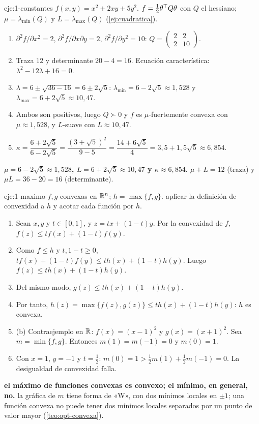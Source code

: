 \begin{solucion}{eje:1-constantes}
\datos $f(x,y)=x^{2}+2xy+5y^{2}$.
\planteamiento $f=\frac12\theta^{\top} Q\theta$ con $Q$ el hessiano; $\mu=\lambda_{\min}(Q)$ y $L=\lambda_{\max}(Q)$ (\cref{ej:cuadratica}).
\pasos
\begin{enumerate}[label=\arabic*.]
  \item $\partial^{2}f/\partial x^{2}=2$, $\partial^{2}f/\partial x\partial y=2$, $\partial^{2}f/\partial y^{2}=10$: $Q=\begin{pmatrix}2&2\\2&10\end{pmatrix}$.
  \item Traza $12$ y determinante $20-4=16$. Ecuación característica: $\lambda^{2}-12\lambda+16=0$.
  \item $\lambda=6\pm\sqrt{36-16}=6\pm 2\sqrt5$: $\lambda_{\min}=6-2\sqrt5\approx 1{,}528$ y $\lambda_{\max}=6+2\sqrt5\approx 10{,}47$.
  \item Ambos son positivos, luego $Q\succ 0$ y $f$ es $\mu$-fuertemente convexa con $\mu\approx 1{,}528$, y $L$-suave con $L\approx 10{,}47$.
  \item $\kappa=\dfrac{6+2\sqrt5}{6-2\sqrt5}=\dfrac{(3+\sqrt5)^{2}}{9-5}=\dfrac{14+6\sqrt5}{4}=3{,}5+1{,}5\sqrt5\approx 6{,}854$.
\end{enumerate}
\resultado \textbf{$\mu=6-2\sqrt5\approx 1{,}528$, $L=6+2\sqrt5\approx 10{,}47$ y $\kappa\approx 6{,}854$.}
\comprobacion $\mu+L=12$ (traza) y $\mu L=36-20=16$ (determinante).
\end{solucion}

\begin{solucion}{eje:1-maximo}
\datos $f,g$ convexas en $\mathbb{R}^{n}$; $h=\max\{f,g\}$.
\planteamiento aplicar la definición de convexidad a $h$ y acotar cada función por $h$.
\pasos
\begin{enumerate}[label=\arabic*.]
  \item Sean $x,y$ y $t\in[0,1]$, y $z=tx+(1-t)y$. Por la convexidad de $f$, $f(z)\le tf(x)+(1-t)f(y)$.
  \item Como $f\le h$ y $t,1-t\ge 0$, $tf(x)+(1-t)f(y)\le th(x)+(1-t)h(y)$. Luego $f(z)\le th(x)+(1-t)h(y)$.
  \item Del mismo modo, $g(z)\le th(x)+(1-t)h(y)$.
  \item Por tanto, $h(z)=\max\{f(z),g(z)\}\le th(x)+(1-t)h(y)$: $h$ es convexa.
  \item (b) Contraejemplo en $\mathbb{R}$: $f(x)=(x-1)^{2}$ y $g(x)=(x+1)^{2}$. Sea $m=\min\{f,g\}$. Entonces $m(1)=m(-1)=0$ y $m(0)=1$.
  \item Con $x=1$, $y=-1$ y $t=\frac12$: $m(0)=1>\frac12m(1)+\frac12m(-1)=0$. La desigualdad de convexidad falla.
\end{enumerate}
\resultado \textbf{el máximo de funciones convexas es convexo; el mínimo, en general, no.}
\comprobacion la gráfica de $m$ tiene forma de «W», con dos mínimos locales en $\pm 1$; una función convexa no puede tener dos mínimos locales separados por un punto de valor mayor (\cref{teo:opt-convexa}).
\end{solucion}

